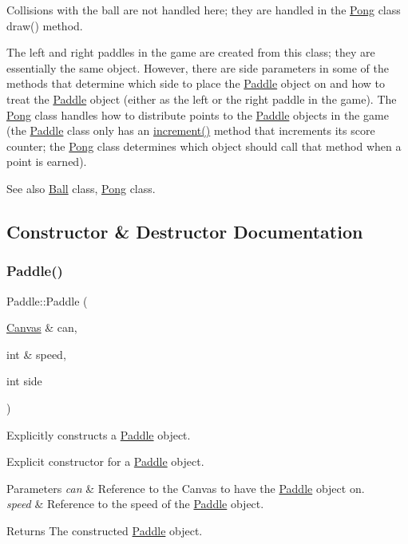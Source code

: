 Collisions with the ball are not handled here; they are handled in the \hyperlink{class_pong}{Pong} class\textquotesingle{} draw() method.

The left and right paddles in the game are created from this class; they are essentially the same object. However, there are side parameters in some of the methods that determine which side to place the \hyperlink{class_paddle}{Paddle} object on and how to treat the \hyperlink{class_paddle}{Paddle} object (either as the left or the right paddle in the game). The \hyperlink{class_pong}{Pong} class handles how to distribute points to the \hyperlink{class_paddle}{Paddle} objects in the game (the \hyperlink{class_paddle}{Paddle} class only has an \hyperlink{class_paddle_a05d45fe2ca65d7baade4162c56a478f0}{increment()} method that increments its score counter; the \hyperlink{class_pong}{Pong} class determines which object should call that method when a point is earned). \begin{DoxySeeAlso}{See also}
\hyperlink{class_ball}{Ball} class, \hyperlink{class_pong}{Pong} class. 
\end{DoxySeeAlso}


\subsection{Constructor \& Destructor Documentation}
\mbox{\label{class_paddle_a5c98ebac2d944073072225b1bb11180a}} 
\subsubsection{\texorpdfstring{Paddle()}{Paddle()}}
{\footnotesize\ttfamily Paddle\+::\+Paddle (\begin{DoxyParamCaption}\item[{\hyperlink{classtsgl_1_1_canvas}{Canvas} \&}]{can,  }\item[{int \&}]{speed,  }\item[{int}]{side }\end{DoxyParamCaption})}



Explicitly constructs a \hyperlink{class_paddle}{Paddle} object. 

Explicit constructor for a \hyperlink{class_paddle}{Paddle} object. 
\begin{DoxyParams}{Parameters}
{\em can} & Reference to the Canvas to have the \hyperlink{class_paddle}{Paddle} object on. \\
\hline
{\em speed} & Reference to the speed of the \hyperlink{class_paddle}{Paddle} object. \\
\hline
\end{DoxyParams}
\begin{DoxyReturn}{Returns}
The constructed \hyperlink{class_paddle}{Paddle} object. 
\end{DoxyReturn}


